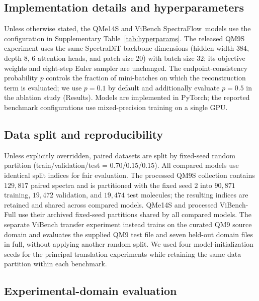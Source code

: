 \documentclass[pdflatex,sn-mathphys-num]{sn-jnl}%
\newcommand{\mname}{SpectraFlow}
\theoremstyle{thmstyleone}%
\theoremstyle{thmstyletwo}%
\theoremstyle{thmstylethree}%
\begin{document}
\subsection*{Implementation details and hyperparameters}

Unless otherwise stated, the QMe14S and ViBench \mname\ models use the configuration in Supplementary Table~\ref{tab:hyperparams}. The released QM9S experiment uses the same SpectraDiT backbone dimensions (hidden width $384$, depth $8$, $6$ attention heads, and patch size $20$) with batch size $32$; its objective weights and eight-step Euler sampler are unchanged.
The endpoint-consistency probability $p$ controls the fraction of mini-batches on which the reconstruction term is evaluated; we use $p=0.1$ by default and additionally evaluate $p=0.5$ in the ablation study (Results).
Models are implemented in PyTorch; the reported benchmark configurations use mixed-precision training on a single GPU.


\subsection*{Data split and reproducibility}

Unless explicitly overridden, paired datasets are split by fixed-seed random partition
(train/validation/test = 0.70/0.15/0.15).
All compared models use identical split indices for fair evaluation. The processed QM9S collection contains $129{,}817$ paired spectra and is partitioned with the fixed seed $2$ into $90{,}871$ training, $19{,}472$ validation, and $19{,}474$ test molecules; the resulting indices are retained and shared across compared models. QMe14S and processed ViBench-Full use their archived fixed-seed partitions shared by all compared models. The separate ViBench transfer experiment instead trains on the curated QM9 source domain and evaluates the supplied QM9 test file and seven held-out domain files in full, without applying another random split. We used four model-initialization seeds for the principal translation experiments while retaining the same data partition within each benchmark.

\subsection*{Experimental-domain evaluation}
\end{document}
